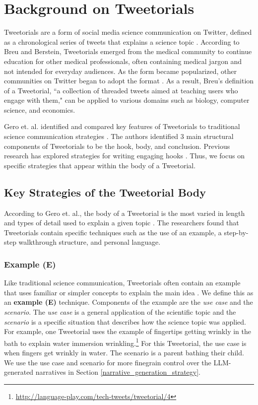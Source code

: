 \section{Background on Tweetorials}
Tweetorials are a form of social media science communication on Twitter, defined as a chronological series of tweets that explains a science topic \cite{symplurTweetorialsFrom, Bruggemann2020-ez}. According to Breu and Berstein, Tweetorials emerged from the medical community to continue education for other medical professionals, often containing medical jargon and not intended for everyday audiences. As the form became popularized, other communities on Twitter began to adopt the format \cite{doi:10.1056/NEJMp1906790, symplurTweetorialsFrom, Bruggemann2020-ez}. As a result, Breu's definition of a Tweetorial, ``a collection of threaded tweets aimed at teaching users who engage with them," can be applied to various domains such as biology, computer science, and economics. 

Gero et. al. identified and compared key features of Tweetorials to traditional science communication strategies \cite{10.1145/3479566}. The authors identified 3 main structural components of Tweetorials to be the hook, body, and conclusion. Previous research has explored strategies for writing engaging hooks \cite{10.1145/3643834.3661587, long2023tweetorialhooksgenerativeai}. Thus, we focus on specific strategies that appear within the body of a Tweetorial. 

\subsection{Key Strategies of the Tweetorial Body}
According to Gero et. al., the body of a Tweetorial is the most varied in length and types of detail used to explain a given topic \cite{10.1145/3479566}. The researchers found that Tweetorials contain specific techniques such as the use of an example, a step-by-step walkthrough structure, and personal language. 

\subsubsection{Example (E)}
\label{example_defintion}
Like traditional science communication, Tweetorials often contain an example that uses familiar or simpler concepts to explain the main idea \cite{10.1145/3479566}. We define this as an \textbf{example (E)} technique. Components of the example are the \textit{use case} and the \textit{scenario}. The \textit{use case} is a general application of the scientific topic and the \textit{scenario} is a specific situation that describes how the science topic was applied. For example, one Tweetorial uses the example of fingertips getting wrinkly in the bath to explain water immersion wrinkling.\footnote{\href{http://language-play.com/tech-tweets/tweetorial/4}{http://language-play.com/tech-tweets/tweetorial/4}} For this Tweetorial, the use case is when fingers get wrinkly in water. The scenario is a parent bathing their child. We use the use case and scenario for more finegrain control over the LLM-generated narratives in Section \ref{narrative_generation_strategy}. 

